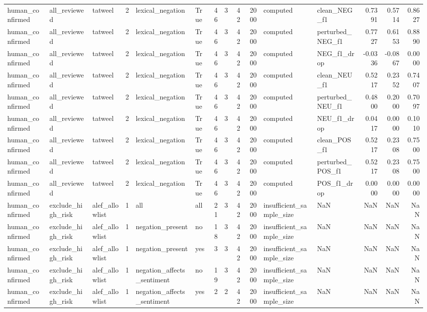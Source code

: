 \begin{tabular}{lllrllrrrrllrrr}
human_confirmed & all_reviewed & tatweel & 2 & lexical_negation & True & 46 & 3 & 42 & 2000 & computed & clean_NEG_f1 & 0.7391 & 0.5714 & 0.8627 \\
human_confirmed & all_reviewed & tatweel & 2 & lexical_negation & True & 46 & 3 & 42 & 2000 & computed & perturbed_NEG_f1 & 0.7727 & 0.6153 & 0.8890 \\
human_confirmed & all_reviewed & tatweel & 2 & lexical_negation & True & 46 & 3 & 42 & 2000 & computed & NEG_f1_drop & -0.0336 & -0.0867 & 0.0000 \\
human_confirmed & all_reviewed & tatweel & 2 & lexical_negation & True & 46 & 3 & 42 & 2000 & computed & clean_NEU_f1 & 0.5217 & 0.2352 & 0.7407 \\
human_confirmed & all_reviewed & tatweel & 2 & lexical_negation & True & 46 & 3 & 42 & 2000 & computed & perturbed_NEU_f1 & 0.4800 & 0.2000 & 0.7097 \\
human_confirmed & all_reviewed & tatweel & 2 & lexical_negation & True & 46 & 3 & 42 & 2000 & computed & NEU_f1_drop & 0.0417 & 0.0000 & 0.1010 \\
human_confirmed & all_reviewed & tatweel & 2 & lexical_negation & True & 46 & 3 & 42 & 2000 & computed & clean_POS_f1 & 0.5217 & 0.2308 & 0.7500 \\
human_confirmed & all_reviewed & tatweel & 2 & lexical_negation & True & 46 & 3 & 42 & 2000 & computed & perturbed_POS_f1 & 0.5217 & 0.2308 & 0.7500 \\
human_confirmed & all_reviewed & tatweel & 2 & lexical_negation & True & 46 & 3 & 42 & 2000 & computed & POS_f1_drop & 0.0000 & 0.0000 & 0.0000 \\
human_confirmed & exclude_high_risk & alef_allowlist & 1 & all & all & 21 & 3 & 42 & 2000 & insufficient_sample_size & NaN & NaN & NaN & NaN \\
human_confirmed & exclude_high_risk & alef_allowlist & 1 & negation_present & no & 18 & 3 & 42 & 2000 & insufficient_sample_size & NaN & NaN & NaN & NaN \\
human_confirmed & exclude_high_risk & alef_allowlist & 1 & negation_present & yes & 3 & 3 & 42 & 2000 & insufficient_sample_size & NaN & NaN & NaN & NaN \\
human_confirmed & exclude_high_risk & alef_allowlist & 1 & negation_affects_sentiment & no & 19 & 3 & 42 & 2000 & insufficient_sample_size & NaN & NaN & NaN & NaN \\
human_confirmed & exclude_high_risk & alef_allowlist & 1 & negation_affects_sentiment & yes & 2 & 2 & 42 & 2000 & insufficient_sample_size & NaN & NaN & NaN & NaN \\

\end{tabular}
